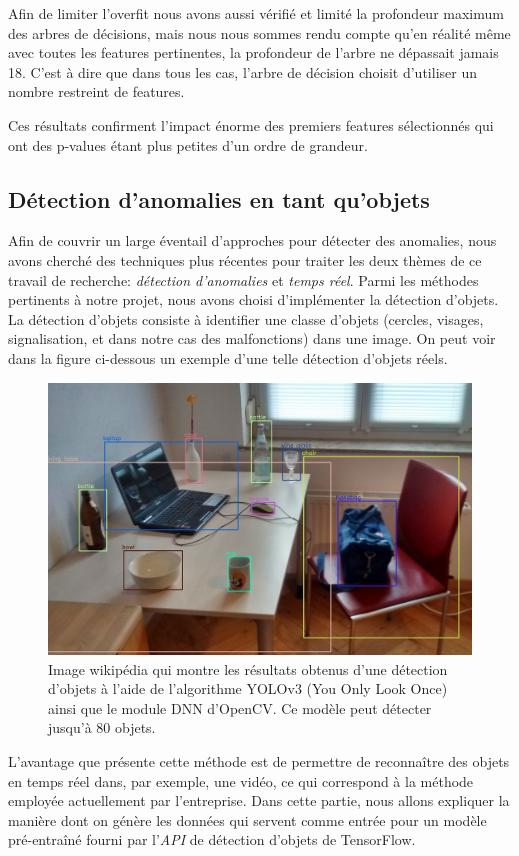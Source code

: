 \documentclass[french]{article}
\theoremstyle{mytheoremstyle}
\theoremstyle{mytheoremstyle}
\theoremstyle{myproblemstyle}
\begin{document}
        Afin de limiter l'overfit nous avons aussi vérifié et limité la profondeur maximum des arbres de décisions, mais nous nous sommes rendu compte qu'en réalité même avec toutes les features pertinentes, la profondeur de l'arbre ne dépassait jamais 18. C'est à dire que dans tous les cas, l'arbre de décision choisit d'utiliser un nombre restreint de features.
        
        Ces résultats confirment l'impact énorme des premiers features sélectionnés qui ont des p-values étant plus petites d'un ordre de grandeur.
    
        \subsection{Détection d'anomalies en tant qu'objets}
        Afin de couvrir un large éventail d'approches pour détecter des anomalies, nous avons cherché des techniques plus récentes pour traiter les deux thèmes de ce travail de recherche: \emph{détection d'anomalies} et \emph{temps réel}. Parmi les méthodes pertinents à notre projet, nous avons choisi d'implémenter la détection d'objets. La détection d'objets consiste à identifier une classe d'objets (cercles, visages, signalisation, et dans notre cas des malfonctions) dans une image\cite{odwikipedia}. On peut voir dans la figure ci-dessous un exemple d'une telle détection d'objets réels.
        \begin{figure}[H]
            \centering
            \includegraphics[width=1\textwidth]{images/real_objects.jpg}
            \caption{Image wikipédia qui montre les résultats obtenus d'une détection d'objets à l'aide de l'algorithme YOLOv3 (You Only Look Once) ainsi que le module DNN d'OpenCV. Ce modèle peut détecter jusqu'à 80 objets.}
            \label{}
        \end{figure}
        L'avantage que présente cette méthode est de permettre de reconnaître des objets en temps réel dans, par exemple, une vidéo, ce qui correspond à la méthode employée actuellement par l'entreprise. Dans cette partie, nous allons expliquer la manière dont on génère les données qui servent comme entrée pour un modèle pré-entraîné fourni par l'\emph{API} de détection d'objets de TensorFlow.
\end{document}
